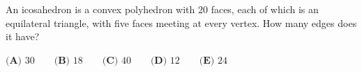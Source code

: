 An icosahedron is a convex polyhedron with $20$ faces, each of which is an equilateral triangle, with five faces meeting at every vertex. How many edges does it have?

$\textbf{(A) } 30\qquad\textbf{(B) } 18\qquad\textbf{(C) } 40\qquad\textbf{(D) } 12\qquad\textbf{(E) } 24$

